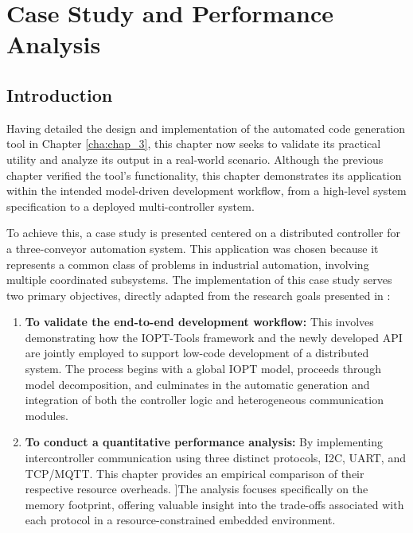 
%


\chapter{Case Study and Performance Analysis}
\label{cha:case_study}


%

\section{Introduction}
\label{sec:case_study_intro}

Having detailed the design and implementation of the automated code generation tool in Chapter \ref{cha:chap_3}, this chapter now seeks to validate its practical utility and analyze its output in a real-world scenario. Although the previous chapter verified the tool's functionality, this chapter demonstrates its application within the intended model-driven development workflow, from a high-level system specification to a deployed multi-controller system.

To achieve this, a case study is presented centered on a distributed controller for a three-conveyor automation system. This application was chosen because it represents a common class of problems in industrial automation, involving multiple coordinated subsystems. The implementation of this case study serves two primary objectives, directly adapted from the research goals presented in \cite{tavaresgomes2026}:

\begin{enumerate}
    \item \textbf{To validate the end-to-end development workflow:} This involves demonstrating how the IOPT-Tools framework and the newly developed API are jointly employed to support low-code development of a distributed system. The process begins with a global IOPT model, proceeds through model decomposition, and culminates in the automatic generation and integration of both the controller logic and heterogeneous communication modules.
    
    \item \textbf{To conduct a quantitative performance analysis:} By implementing intercontroller communication using three distinct protocols, I2C, UART, and TCP/MQTT. This chapter provides an empirical comparison of their respective resource overheads. ]The analysis focuses specifically on the memory footprint, offering valuable insight into the trade-offs associated with each protocol in a resource-constrained embedded environment.
\end{enumerate}

